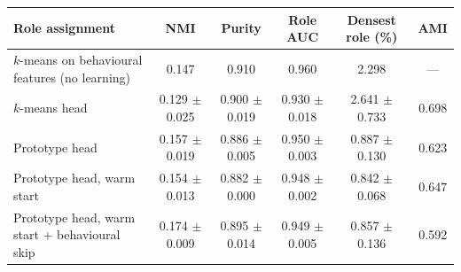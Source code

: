 \small
\caption{\textbf{Role-assignment variants on the primary network.} Every column is computed from labels that never enter training: entity categories come from third-party address directories (525 labelled addresses) and designations from the seizure orders. NMI and purity measure agreement between roles and entity categories. Role AUC scores each address by the designated-address density of its role and reports the area under the ROC curve for separating designated from undesignated addresses; unlike the density of the densest role it does not fall mechanically when roles are large, so it is comparable across partitions of different shape. AMI is the agreement between partitions from three independently trained models. Learned variants are reported as mean $\pm$ s.d. over the same three training seeds; the first row is deterministic. Reading down the table, learning improves agreement with entity labels and removes the role collapse of the $k$-means head, but no learned variant improves on a plain $k$-means of the same behavioural features in placing designated addresses, and all are less reproducible across training seeds. We adopt the last row and, because of this, rest the structural claims of the paper on address-level tests that use no partition (Supplementary Table~\ref{tab:backbone-tests}).}
\label{tab:model-variants}
\begin{tabular}{lccccc}
\toprule
Role assignment & NMI & Purity & Role AUC & Densest role (\%) & AMI \\
\midrule
$k$-means on behavioural features (no learning) & 0.147 & 0.910 & 0.960 & 2.298 & --- \\
$k$-means head & 0.129 $\pm$ 0.025 & 0.900 $\pm$ 0.019 & 0.930 $\pm$ 0.018 & 2.641 $\pm$ 0.733 & 0.698 \\
Prototype head & 0.157 $\pm$ 0.019 & 0.886 $\pm$ 0.005 & 0.950 $\pm$ 0.003 & 0.887 $\pm$ 0.130 & 0.623 \\
Prototype head, warm start & 0.154 $\pm$ 0.013 & 0.882 $\pm$ 0.000 & 0.948 $\pm$ 0.002 & 0.842 $\pm$ 0.068 & 0.647 \\
Prototype head, warm start + behavioural skip & 0.174 $\pm$ 0.009 & 0.895 $\pm$ 0.014 & 0.949 $\pm$ 0.005 & 0.857 $\pm$ 0.136 & 0.592 \\
\bottomrule
\end{tabular}

